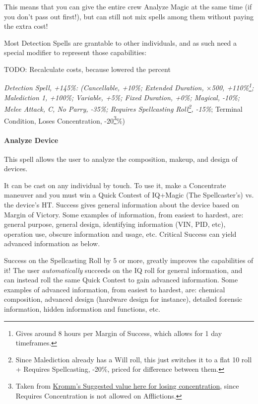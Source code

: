 \begin{multicols*}{3}
	This means that you can give the entire crew Analyze Magic at the same time (if you don't pass out first!), but can still not mix spells among them without paying the extra cost!
	
	Most Detection Spells are grantable to other individuals, and as such need a special modifier to represent those capabilities:
	
	TODO: Recalculate costs, because lowered the percent
	
	\textcolor{OliveGreen}{\textit{Detection Spell, +145\%: (Cancellable, +10\%; Extended Duration, \(\times\)500, +110\%\footnote{Gives around 8 hours per Margin of Success, which allows for 1 day timeframes.}; Malediction 1, +100\%; Variable, +5\%; Fixed Duration, +0\%; Magical, -10\%; Melee Attack, C, No Parry, -35\%; Requires Spellcasting Roll\footnote{Since Malediction already has a Will roll, this just switches it to a flat 10 roll + Requires Spellcasting, -20\%, priced for difference between them.}, -15\%}; Terminal Condition, Loses Concentration, -20\footnote{Taken from \textcolor{Blue}{\href{http://forums.sjgames.com/showpost.php?p=817197&postcount=7}{Kromm's Suggested value here for losing concentration}}, since Requires Concentration is not allowed on Afflictions.}\%)}
	
	\paragraph{Analyze Device}
	
	This spell allows the user to analyze the composition, makeup, and design of devices. 
	
	It can be cast on any individual by touch. To use it, make a Concentrate maneuver and you must win a Quick Contest of IQ+Magic (The Spellcaster's) vs. the device's HT. Success gives general information about the device based on Margin of Victory. Some examples of information, from easiest to hardest, are: general purpose, general design, identifying information (VIN, PID, etc), operation use, obscure information and usage, etc. Critical Success can yield advanced information as below.
	
	Success on the Spellcasting Roll by 5 or more, greatly improves the capabilities of it! The user \textit{automatically} succeeds on the IQ roll for general information, and can instead roll the same Quick Contest to gain advanced information. Some examples of advanced information, from easiest to hardest, are: chemical composition, advanced design (hardware design for instance), detailed forensic information, hidden information and functions, etc.
	

\end{multicols*}
